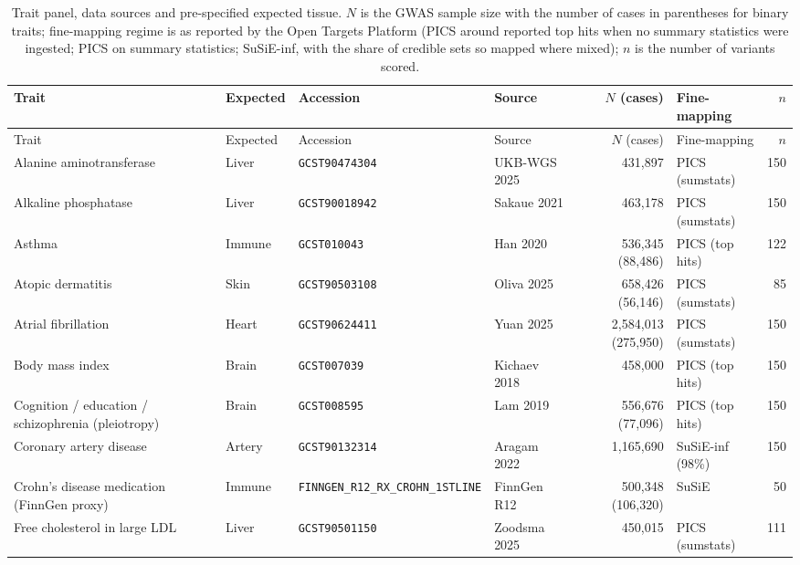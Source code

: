 \begingroup\footnotesize\setlength{\tabcolsep}{4pt}
\begin{longtable}{>{\raggedright\arraybackslash}p{3.4cm}>{\raggedright\arraybackslash}p{1.4cm}>{\raggedright\arraybackslash}p{2.5cm}>{\raggedright\arraybackslash}p{1.9cm}r>{\raggedright\arraybackslash}p{2.0cm}r}
\caption{Trait panel, data sources and pre-specified expected tissue. $N$ is the GWAS sample size with the number of cases in parentheses for binary traits; fine-mapping regime is as reported by the Open Targets Platform (PICS around reported top hits when no summary statistics were ingested; PICS on summary statistics; SuSiE-inf, with the share of credible sets so mapped where mixed); $n$ is the number of variants scored.}\label{tab:traits}\\
\toprule Trait & Expected & Accession & Source & $N$ (cases) & Fine-mapping & $n$ \\ \midrule \endfirsthead
\toprule Trait & Expected & Accession & Source & $N$ (cases) & Fine-mapping & $n$ \\ \midrule \endhead
Alanine aminotransferase & Liver & \texttt{GCST90474304} & UKB-WGS 2025 & 431,897 & PICS (sumstats) & 150 \\
Alkaline phosphatase & Liver & \texttt{GCST90018942} & Sakaue 2021 & 463,178 & PICS (sumstats) & 150 \\
Asthma & Immune & \texttt{GCST010043} & Han 2020 & 536,345 (88,486) & PICS (top hits) & 122 \\
Atopic dermatitis & Skin & \texttt{GCST90503108} & Oliva 2025 & 658,426 (56,146) & PICS (sumstats) & 85 \\
Atrial fibrillation & Heart & \texttt{GCST90624411} & Yuan 2025 & 2,584,013 (275,950) & PICS (sumstats) & 150 \\
Body mass index & Brain & \texttt{GCST007039} & Kichaev 2018 & 458,000 & PICS (top hits) & 150 \\
Cognition / education / schizophrenia (pleiotropy) & Brain & \texttt{GCST008595} & Lam 2019 & 556,676 (77,096) & PICS (top hits) & 150 \\
Coronary artery disease & Artery & \texttt{GCST90132314} & Aragam 2022 & 1,165,690 & SuSiE-inf (98\%) & 150 \\
Crohn's disease medication (FinnGen proxy) & Immune & \texttt{FINNGEN\_\allowbreak R12\_\allowbreak RX\_\allowbreak CROHN\_\allowbreak 1STLINE} & FinnGen R12 & 500,348 (106,320) & SuSiE & 50 \\
Free cholesterol in large LDL & Liver & \texttt{GCST90501150} & Zoodsma 2025 & 450,015 & PICS (sumstats) & 111 \\

\end{longtable}
